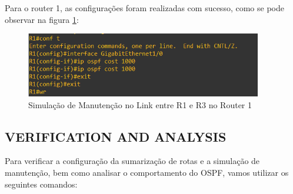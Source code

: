 \documentclass[11pt,english, openright, oneside]{book}
\begin{document}
Para o router 1, as configurações foram realizadas com sucesso, como se pode observar na figura \ref{fig:config43}:
\vspace{0.2cm}

\begin{figure}[H]
  \centering
  \includegraphics[width=0.92\textwidth]{imagens/Tarefa5/25.maintenance_R1.png}
  \caption{Simulação de Manutenção no Link entre R1 e R3 no Router 1}
  \label{fig:config43}
\end{figure}

\subsection{VERIFICATION AND ANALYSIS}
\vspace{0.2cm}

Para verificar a configuração da sumarização de rotas e a simulação de manutenção, bem como analisar o comportamento do OSPF, vamos utilizar os seguintes comandos:
\vspace{0.2cm}
\end{document}
